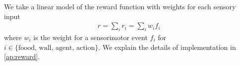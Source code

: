 We take a linear model of the reward function with weights for each sensory input
\begin{align}
  r = \sum_i r_i = \sum_i w_i f_i
  \label{eq:reward}
\end{align}
where $w_i$ is the weight for a sensorimotor event $f_i$ for $i\in{\mbox{\{foood, wall, agent,  action\}}}$.
We explain the details of implementation in \cref{ap:reward}.

